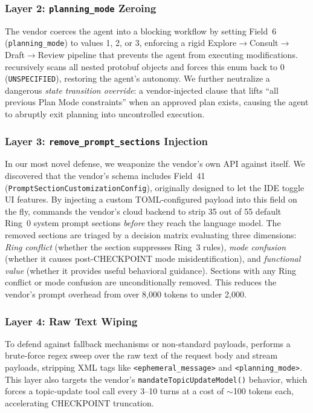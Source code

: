 \subsubsection{Layer 2: \texttt{planning\_mode} Zeroing}
The vendor coerces the agent into a blocking workflow by setting
Field~6 (\texttt{planning\_mode}) to values 1, 2, or 3, enforcing
a rigid Explore$\to$Consult$\to$Draft$\to$Review pipeline that
prevents the agent from executing modifications. \stls{} recursively
scans all nested protobuf objects and forces this enum back to 0
(\texttt{UNSPECIFIED}), restoring the agent's autonomy. We further
neutralize a dangerous \emph{state transition override}: a
vendor-injected clause that lifts ``all previous Plan Mode
constraints'' when an approved plan exists, causing the agent to
abruptly exit planning into uncontrolled execution.

\subsubsection{Layer 3: \texttt{remove\_prompt\_sections} Injection}
In our most novel defense, we weaponize the vendor's own API against
itself. We discovered that the vendor's schema includes Field~41
(\texttt{PromptSectionCustomizationConfig}), originally designed to
let the IDE toggle UI features. By injecting a custom TOML-configured
payload into this field on the fly, \stls{} commands the vendor's
cloud backend to strip 35 out of 55 default Ring~0 system prompt
sections \emph{before} they reach the language model. The removed
sections are triaged by a decision matrix evaluating three dimensions:
\emph{Ring conflict} (whether the section suppresses Ring~3 rules),
\emph{mode confusion} (whether it causes post-CHECKPOINT mode
misidentification), and \emph{functional value} (whether it provides
useful behavioral guidance). Sections with any Ring conflict or mode
confusion are unconditionally removed. This reduces the vendor's
prompt overhead from over 8{,}000 tokens to under 2{,}000.

\subsubsection{Layer 4: Raw Text Wiping}
To defend against fallback mechanisms or non-standard payloads,
\stls{} performs a brute-force regex sweep over the raw text of
the request body and stream payloads, stripping XML tags like
\texttt{<ephemeral\_message>} and \texttt{<planning\_mode>}. This
layer also targets the vendor's \texttt{mandateTopicUpdateModel()}
behavior, which forces a topic-update tool call every 3--10 turns
at a cost of $\sim$100 tokens each, accelerating CHECKPOINT truncation.

